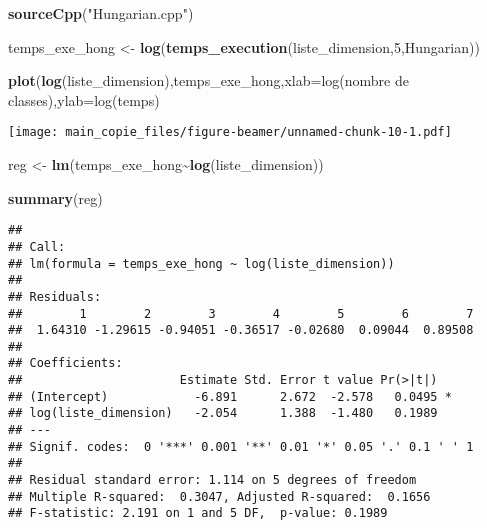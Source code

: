 \documentclass[
  ignorenonframetext,
]{beamer}
\newenvironment{Shaded}{\begin{snugshade}}{\end{snugshade}}
\newcommand{\AttributeTok}[1]{\textcolor[rgb]{0.13,0.29,0.53}{#1}}
\newcommand{\DecValTok}[1]{\textcolor[rgb]{0.00,0.00,0.81}{#1}}
\newcommand{\FunctionTok}[1]{\textcolor[rgb]{0.13,0.29,0.53}{\textbf{#1}}}
\newcommand{\NormalTok}[1]{#1}
\newcommand{\OtherTok}[1]{\textcolor[rgb]{0.56,0.35,0.01}{#1}}
\newcommand{\SpecialCharTok}[1]{\textcolor[rgb]{0.81,0.36,0.00}{\textbf{#1}}}
\newcommand{\StringTok}[1]{\textcolor[rgb]{0.31,0.60,0.02}{#1}}
\begin{document}
\begin{frame}[fragile]{}
\protect\hypertarget{section-15}{}
\begin{Shaded}
\begin{Highlighting}[]
\FunctionTok{sourceCpp}\NormalTok{(}\StringTok{"Hungarian.cpp"}\NormalTok{)}
\end{Highlighting}
\end{Shaded}

\begin{Shaded}
\begin{Highlighting}[]
\NormalTok{temps\_exe\_hong }\OtherTok{\textless{}{-}} \FunctionTok{log}\NormalTok{(}\FunctionTok{temps\_execution}\NormalTok{(liste\_dimension,}\DecValTok{5}\NormalTok{,Hungarian))}

\FunctionTok{plot}\NormalTok{(}\FunctionTok{log}\NormalTok{(liste\_dimension),temps\_exe\_hong,}\AttributeTok{xlab=}\StringTok{\textquotesingle{}log(nombre de classes)\textquotesingle{}}\NormalTok{,}\AttributeTok{ylab=}\StringTok{\textquotesingle{}log(temps\textquotesingle{}}\NormalTok{)}
\end{Highlighting}
\end{Shaded}

\texttt{[image: main\_copie\_files/figure-beamer/unnamed-chunk-10-1.pdf]}

\begin{Shaded}
\begin{Highlighting}[]
\NormalTok{reg }\OtherTok{\textless{}{-}} \FunctionTok{lm}\NormalTok{(temps\_exe\_hong}\SpecialCharTok{\textasciitilde{}}\FunctionTok{log}\NormalTok{(liste\_dimension))}

\FunctionTok{summary}\NormalTok{(reg)}
\end{Highlighting}
\end{Shaded}

\begin{verbatim}
## 
## Call:
## lm(formula = temps_exe_hong ~ log(liste_dimension))
## 
## Residuals:
##        1        2        3        4        5        6        7 
##  1.64310 -1.29615 -0.94051 -0.36517 -0.02680  0.09044  0.89508 
## 
## Coefficients:
##                      Estimate Std. Error t value Pr(>|t|)  
## (Intercept)            -6.891      2.672  -2.578   0.0495 *
## log(liste_dimension)   -2.054      1.388  -1.480   0.1989  
## ---
## Signif. codes:  0 '***' 0.001 '**' 0.01 '*' 0.05 '.' 0.1 ' ' 1
## 
## Residual standard error: 1.114 on 5 degrees of freedom
## Multiple R-squared:  0.3047, Adjusted R-squared:  0.1656 
## F-statistic: 2.191 on 1 and 5 DF,  p-value: 0.1989
\end{verbatim}


\end{frame}
\end{document}
